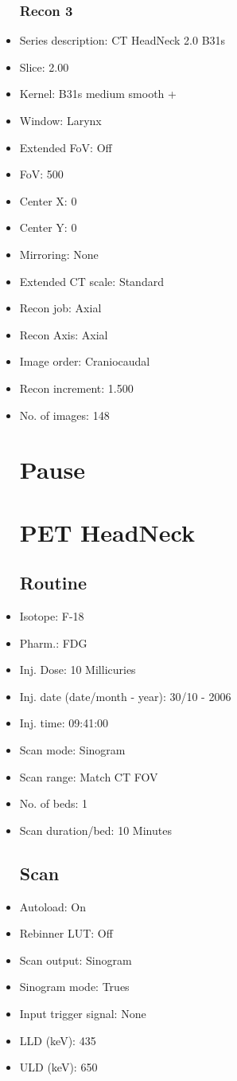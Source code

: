\documentclass[12pt]{article}
\begin{document}
\begin{itemize}
\subsubsection{Recon 3}
\item Series description: CT HeadNeck 2.0 B31s
\item Slice: 2.00
\item Kernel: B31s medium smooth +
\item Window: Larynx
\item Extended FoV: Off
\item FoV: 500
\item Center X: 0
\item Center Y: 0
\item Mirroring: None
\item Extended CT scale: Standard
\item Recon job: Axial
\item Recon Axis: Axial
\item Image order: Craniocaudal
\item Recon increment: 1.500
\item No. of images: 148
\section{Pause}
\section{PET HeadNeck}\subsection{Routine}
\item Isotope: F-18
\item Pharm.: FDG
\item Inj. Dose: 10 Millicuries
\item Inj. date (date/month - year): 30/10 - 2006
\item Inj. time: 09:41:00
\item Scan mode: Sinogram
\item Scan range: Match CT FOV
\item No. of beds: 1
\item Scan duration/bed: 10 Minutes
\subsection{Scan}
\item Autoload: On
\item Rebinner LUT: Off
\item Scan output: Sinogram
\item Sinogram mode: Trues
\item Input trigger signal: None
\item LLD (keV): 435
\item ULD (keV): 650

\end{itemize}
\end{document}
